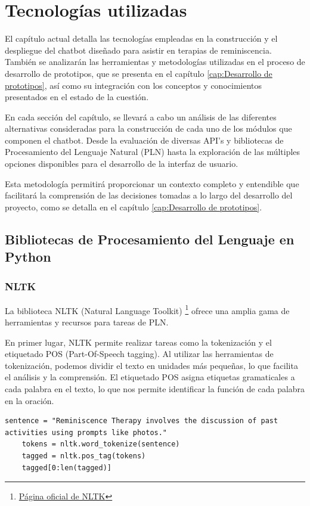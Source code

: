 \chapter{Tecnologías utilizadas}
\label{cap:TecnologiasUtilizadas}

El capítulo actual detalla las tecnologías empleadas en la construcción y el despliegue del chatbot diseñado para asistir en terapias de reminiscencia. También se analizarán las herramientas y metodologías utilizadas en el proceso de desarrollo de prototipos, que se presenta en el capítulo \ref{cap:Desarrollo de prototipos}, así como su integración con los conceptos y conocimientos presentados en el estado de la cuestión.

En cada sección del capítulo, se llevará a cabo un análisis de las diferentes alternativas consideradas para la construcción de cada uno de los módulos que componen el chatbot. Desde la evaluación de diversas API's y bibliotecas de Procesamiento del Lenguaje Natural (PLN) hasta la exploración de las múltiples opciones disponibles para el desarrollo de la interfaz de usuario.

Esta metodología permitirá proporcionar un contexto completo y entendible que facilitará la comprensión de las decisiones tomadas a lo largo del desarrollo del proyecto, como se detalla en el capítulo \ref{cap:Desarrollo de prototipos}. 

\section{Bibliotecas de Procesamiento del Lenguaje en Python}

\subsection{NLTK}
La biblioteca NLTK (Natural Language Toolkit) \footnote{\href{https://www.nltk.org/}{Página oficial de NLTK}} ofrece una amplia gama de herramientas y recursos para tareas de PLN.

En primer lugar, NLTK permite realizar tareas como la tokenización y el  etiquetado POS (Part-Of-Speech tagging). Al utilizar las herramientas de tokenización, podemos dividir el texto en unidades más pequeñas, lo que facilita el análisis y la comprensión. El etiquetado POS asigna etiquetas gramaticales a cada palabra en el texto, lo que nos permite identificar la función de cada palabra en la oración. \\

\begin{lstlisting}[style=SpyderStyle, caption={Ejemplo de código en Python. Se pueden consultar más ejemplos en \cite{bird2009natural}}, captionpos=b, label={lst:python},breaklines = true]
	sentence = "Reminiscence Therapy involves the discussion of past activities using prompts like photos."
	tokens = nltk.word_tokenize(sentence)
	tagged = nltk.pos_tag(tokens)
	tagged[0:len(tagged)]
\end{lstlisting}

